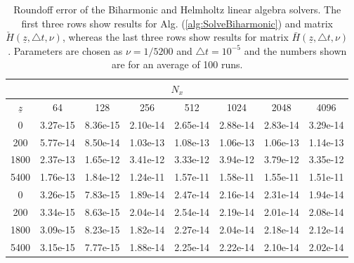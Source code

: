 \documentclass[preprint]{elsarticle}
\newcommand{\N}[1]{\check{#1}}
\newcommand{\D}[1]{\bar{#1}}
\begin{document}
\begin{table}
	\caption{ Roundoff error of the Biharmonic and Helmholtz linear algebra solvers. The first three 
	rows show results for Alg. (\ref{alg:SolveBiharmonic}) and matrix $\N{H}(\underline{z}, 
	\triangle t, \nu)$, whereas the last three rows show results for matrix 
	$\D{H}(\underline{z}, \triangle t, \nu)$. Parameters 
	are chosen as $\nu=1/5200$ and $\triangle t=10^{-5}$ and the numbers shown 
	are for an average of 100 runs.	 \label{tab:roundoff}}
   \begin{tabular}{cccccccc}
	   \multicolumn{8}{c}{$N_x$} \\
	   \hline
$\underline{z}$ & 64 & 128 & 256 & 512 & 1024 & 2048 & 4096 \\ 
\hline
0 & 3.27e-15  & 8.36e-15  & 2.10e-14  & 2.65e-14  & 2.88e-14  & 2.83e-14  & 3.29e-14  \\ 
200 & 5.77e-14  & 8.50e-14  & 1.03e-13  & 1.08e-13  & 1.06e-13  & 1.06e-13  & 1.14e-13  \\ 
1800 & 2.37e-13  & 1.65e-12  & 3.41e-12  & 3.33e-12  & 3.94e-12  & 3.79e-12  & 3.35e-12  \\ 
5400 & 1.76e-13  & 1.84e-12  & 1.24e-11  & 1.57e-11  & 1.58e-11  & 1.55e-11  & 1.51e-11  \\ 
\hline
0 & 3.26e-15  & 7.83e-15  & 1.89e-14  & 2.47e-14  & 2.16e-14  & 2.31e-14  & 1.94e-14  \\ 
200 & 3.34e-15  & 8.63e-15  & 2.04e-14  & 2.54e-14  & 2.19e-14  & 2.01e-14  & 2.08e-14  \\ 
1800 & 3.09e-15  & 8.23e-15  & 1.82e-14  & 2.27e-14  & 2.04e-14  & 2.18e-14  & 2.12e-14  \\ 
5400 & 3.15e-15  & 7.77e-15  & 1.88e-14  & 2.25e-14  & 2.22e-14  & 2.10e-14  & 2.02e-14 
		
\end{tabular}
\end{table}
\end{document}
